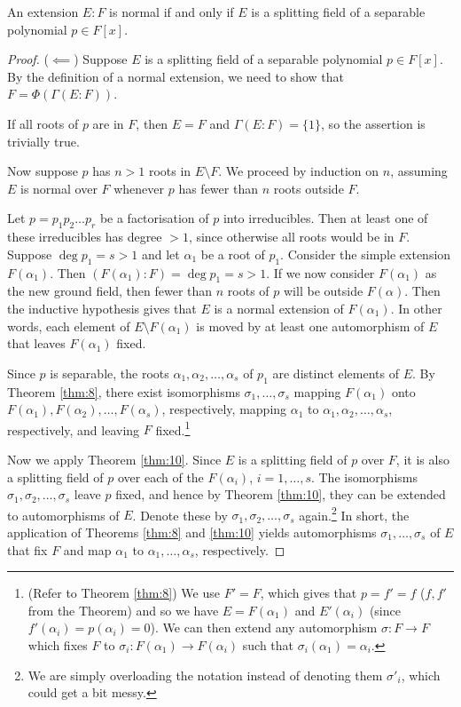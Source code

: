 \begin{theorem}\label{thm:15}
	An extension $E : F$ is normal if and only if $E$ is a splitting field of a separable polynomial $p \in F[x]$.
	\begin{proof}
		($\impliedby$) Suppose $E$ is a splitting field of a separable polynomial $p \in F[x]$. By the definition of a normal extension, we need to show that $F = \Phi(\Gamma(E : F))$.
		
		If all roots of $p$ are in $F$, then $E = F$ and $\Gamma(E : F) = \{1\}$, so the assertion is trivially true.
		
		Now suppose $p$ has $n > 1$ roots in $E \setminus F$. We proceed by induction on $n$, assuming $E$ is normal over $F$ whenever $p$ has fewer than $n$ roots outside $F$.
		
		Let $p = p_1 p_2 \dots p_r$ be a factorisation of $p$ into irreducibles. Then at least one of these irreducibles has degree $> 1$, since otherwise all roots would be in $F$. Suppose $\deg{p_1} = s > 1$ and let $\alpha_1$ be a root of $p_1$. Consider the simple extension $F(\alpha_1)$. Then $(F(\alpha_1) : F) = \deg{p_1} = s > 1$. If we now consider $F(\alpha_1)$ as the new ground field, then fewer than $n$ roots of $p$ will be outside $F(\alpha)$. Then the inductive hypothesis gives that $E$ is a normal extension of $F(\alpha_1)$. In other words, each element of $E \setminus F(\alpha_1)$ is moved by at least one automorphism of $E$ that leaves $F(\alpha_1)$ fixed.
		
		Since $p$ is separable, the roots $\alpha_1, \alpha_2, \dots, \alpha_s$ of $p_1$ are distinct elements of $E$. By Theorem \ref{thm:8}, there exist isomorphisms $\sigma_1, \dots, \sigma_s$ mapping $F(\alpha_1)$ onto $F(\alpha_1), F(\alpha_2), \dots, F(\alpha_s)$, respectively, mapping $\alpha_1$ to $\alpha_1, \alpha_2, \dots, \alpha_s$, respectively, and leaving $F$ fixed.\footnote{(Refer to Theorem \ref{thm:8}) We use $F' = F$, which gives that $p = f' = f$ ($f, f'$ from the Theorem) and so we have $E = F(\alpha_1)$ and $E'(\alpha_i)$ (since $f'(\alpha_i) = p(\alpha_i) = 0$). We can then extend any automorphism $\sigma : F \to F$ which fixes $F$ to $\sigma_i : F(\alpha_1) \to F(\alpha_i)$ such that $\sigma_i(\alpha_1) = \alpha_i$.}
		
		Now we apply Theorem \ref{thm:10}. Since $E$ is a splitting field of $p$ over $F$, it is also a splitting field of $p$ over each of the $F(\alpha_i)$, $i = 1, \dots, s$. The isomorphisms $\sigma_1, \sigma_2, \dots, \sigma_s$ leave $p$ fixed, and hence by Theorem \ref{thm:10}, they can be extended to automorphisms of $E$. Denote these by $\sigma_1, \sigma_2, \dots, \sigma_s$ again.\footnote{We are simply overloading the notation instead of denoting them $\sigma'_i$, which could get a bit messy.} In short, the application of Theorems \ref{thm:8} and \ref{thm:10} yields automorphisms $\sigma_1, \dots, \sigma_s$ of $E$ that fix $F$ and map $\alpha_1$ to $\alpha_1, \dots, \alpha_s$, respectively.
		

\end{proof}
\end{theorem}
